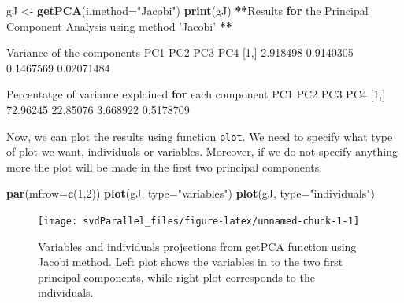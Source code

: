 \documentclass[]{article}
\newenvironment{Shaded}{\begin{snugshade}}{\end{snugshade}}
\newcommand{\KeywordTok}[1]{\textcolor[rgb]{0.13,0.29,0.53}{\textbf{#1}}}
\newcommand{\DataTypeTok}[1]{\textcolor[rgb]{0.13,0.29,0.53}{#1}}
\newcommand{\DecValTok}[1]{\textcolor[rgb]{0.00,0.00,0.81}{#1}}
\newcommand{\FloatTok}[1]{\textcolor[rgb]{0.00,0.00,0.81}{#1}}
\newcommand{\StringTok}[1]{\textcolor[rgb]{0.31,0.60,0.02}{#1}}
\newcommand{\ControlFlowTok}[1]{\textcolor[rgb]{0.13,0.29,0.53}{\textbf{#1}}}
\newcommand{\OperatorTok}[1]{\textcolor[rgb]{0.81,0.36,0.00}{\textbf{#1}}}
\newcommand{\NormalTok}[1]{#1}
\begin{document}
\begin{Shaded}
\begin{Highlighting}[]
\NormalTok{gJ <-}\StringTok{ }\KeywordTok{getPCA}\NormalTok{(i,}\DataTypeTok{method=}\StringTok{"Jacobi"}\NormalTok{)}
\KeywordTok{print}\NormalTok{(gJ)}
\OperatorTok{**}\NormalTok{Results }\ControlFlowTok{for}\NormalTok{ the Principal Component Analysis using method }\StringTok{'Jacobi'} \OperatorTok{**}

\NormalTok{Variance of the components}
\NormalTok{          PC1       PC2       PC3        PC4}
\NormalTok{[}\DecValTok{1}\NormalTok{,] }\FloatTok{2.918498} \FloatTok{0.9140305} \FloatTok{0.1467569} \FloatTok{0.02071484}

\NormalTok{Percentatge of variance explained }\ControlFlowTok{for}\NormalTok{ each component}
\NormalTok{          PC1      PC2      PC3       PC4}
\NormalTok{[}\DecValTok{1}\NormalTok{,] }\FloatTok{72.96245} \FloatTok{22.85076} \FloatTok{3.668922} \FloatTok{0.5178709}
\end{Highlighting}
\end{Shaded}

Now, we can plot the results using function \texttt{plot}. We need to
specify what type of plot we want, individuals or variables. Moreover,
if we do not specify anything more the plot will be made in the first
two principal components.

\begin{Shaded}
\begin{Highlighting}[]
\KeywordTok{par}\NormalTok{(}\DataTypeTok{mfrow=}\KeywordTok{c}\NormalTok{(}\DecValTok{1}\NormalTok{,}\DecValTok{2}\NormalTok{))}
\KeywordTok{plot}\NormalTok{(gJ, }\DataTypeTok{type=}\StringTok{"variables"}\NormalTok{)}
\KeywordTok{plot}\NormalTok{(gJ, }\DataTypeTok{type=}\StringTok{"individuals"}\NormalTok{)}
\end{Highlighting}
\end{Shaded}

\begin{figure}

{\centering \texttt{[image: svdParallel\_files/figure-latex/unnamed-chunk-1-1]} 

}

\caption{Variables and individuals projections from getPCA function using Jacobi method. Left plot shows the variables in to the two first principal components, while right plot corresponds to the individuals.}\label{fig:unnamed-chunk-1}
\end{figure}
\end{document}
